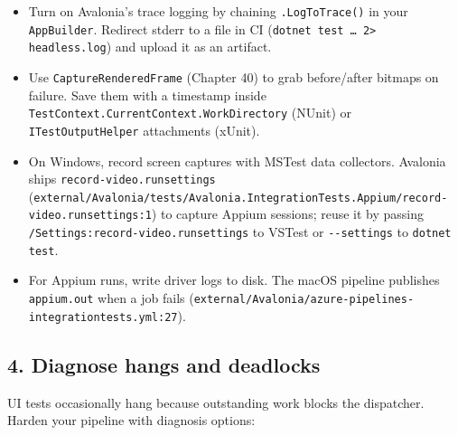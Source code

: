 \begin{itemize}
\tightlist
\item
  Turn on Avalonia's trace logging by chaining
  \passthrough{\lstinline!.LogToTrace()!} in your
  \passthrough{\lstinline!AppBuilder!}. Redirect stderr to a file in CI
  (\passthrough{\lstinline!dotnet test … 2> headless.log!}) and upload
  it as an artifact.
\item
  Use \passthrough{\lstinline!CaptureRenderedFrame!} (Chapter 40) to
  grab before/after bitmaps on failure. Save them with a timestamp
  inside
  \passthrough{\lstinline!TestContext.CurrentContext.WorkDirectory!}
  (NUnit) or \passthrough{\lstinline!ITestOutputHelper!} attachments
  (xUnit).
\item
  On Windows, record screen captures with MSTest data collectors.
  Avalonia ships \passthrough{\lstinline!record-video.runsettings!}
  (\passthrough{\lstinline!external/Avalonia/tests/Avalonia.IntegrationTests.Appium/record-video.runsettings:1!})
  to capture Appium sessions; reuse it by passing
  \passthrough{\lstinline!/Settings:record-video.runsettings!} to VSTest
  or \passthrough{\lstinline!--settings!} to
  \passthrough{\lstinline!dotnet test!}.
\item
  For Appium runs, write driver logs to disk. The macOS pipeline
  publishes \passthrough{\lstinline!appium.out!} when a job fails
  (\passthrough{\lstinline!external/Avalonia/azure-pipelines-integrationtests.yml:27!}).
\end{itemize}

\subsection{4. Diagnose hangs and
deadlocks}\label{diagnose-hangs-and-deadlocks}

UI tests occasionally hang because outstanding work blocks the
dispatcher. Harden your pipeline with diagnosis options:

